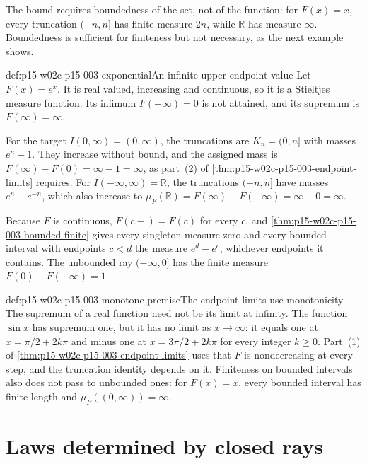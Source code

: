 The bound requires boundedness of the set, not of the function: for
\(F(x)=x\), every truncation \((-n,n]\) has finite measure \(2n\),
while \(\mathbb R\) has measure \(\infty\). Boundedness is sufficient
for finiteness but not necessary, as the next example shows.

\begin{hbexample}{def:p15-w02c-p15-003-exponential}{An infinite upper endpoint value}
Let \(F(x)=e^x\). It is real valued, increasing and continuous, so it is a
Stieltjes measure function. Its infimum \(F(-\infty)=0\) is not
attained, and its supremum is \(F(\infty)=\infty\).

For the target \(I(0,\infty)=(0,\infty)\), the truncations are
\(K_n=(0,n]\) with masses \(e^n-1\). They increase without bound, and the
assigned mass is \(F(\infty)-F(0)=\infty-1=\infty\), as part~(2) of
\cref{thm:p15-w02c-p15-003-endpoint-limits} requires. For
\(I(-\infty,\infty)=\mathbb R\), the truncations \((-n,n]\) have masses
\(e^n-e^{-n}\), which also increase to
\(\mu_F(\mathbb R)=F(\infty)-F(-\infty)=\infty-0=\infty\).

Because \(F\) is continuous, \(F(c-)=F(c)\) for every \(c\), and
\cref{thm:p15-w02c-p15-003-bounded-finite} gives every singleton measure
zero and every bounded interval with endpoints \(c<d\) the measure
\(e^d-e^c\), whichever endpoints it contains. The unbounded ray
\((-\infty,0]\) has the finite measure \(F(0)-F(-\infty)=1\).
\end{hbexample}

\begin{hbwarning}{def:p15-w02c-p15-003-monotone-premise}{The endpoint limits use monotonicity}
The supremum of a real function need not be its limit at infinity. The
function \(\sin x\) has supremum one, but it has no limit as
\(x\to\infty\): it equals one at \(x=\pi/2+2k\pi\) and minus one at
\(x=3\pi/2+2k\pi\) for every integer \(k\geq0\). Part~(1) of
\cref{thm:p15-w02c-p15-003-endpoint-limits} uses that \(F\) is
nondecreasing at every step, and the truncation identity depends on it.
Finiteness on bounded intervals also does not pass to unbounded ones:
for \(F(x)=x\), every bounded interval has finite length and
\(\mu_F((0,\infty))=\infty\).
\end{hbwarning}

\section{Laws determined by closed rays}
\label{sec:p15-w02c-p15-003-ray-laws}

